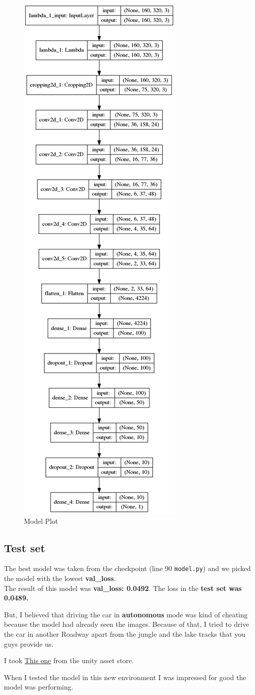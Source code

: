 \documentclass[11pt, a4paper]{article}
\begin{document}
\begin{figure}[htpb!]
	\centering
	\includegraphics[height=0.8\linewidth]{model_plot}
	\caption{Model Plot}
	\label{fig:model_plot}
\end{figure}



\subsection{Test set}%
\label{sub:test_set}


The best model was taken from the checkpoint (line 90 \texttt{model.py}) and we picked the model with the lowest \textbf{val\_loss}. \\

The result of this model was \textbf{val\_loss: 0.0492}. The loss in the \textbf{test set was 0.0489.}


But, I believed that driving the car in \textbf{autonomous} mode was kind of cheating because the model had already seen the images. Because of that, I tried to drive the car in another Roadway apart from the jungle and the lake tracks that you guys provide us.

I took \href{https://assetstore.unity.com/?category=3d%2Fenvironments%2Froadways&orderBy=1}{This one} from the unity asset store.


When I tested the model in this new environment I was impressed for good the model was performing.
\end{document}
